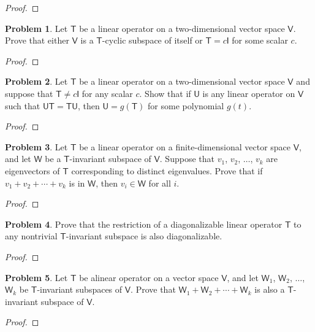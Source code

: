 \documentclass[12pt]{book}
\theoremstyle{definition}
\newtheorem{problem}{Problem}
\begin{document}
	\begin{proof}
	\end{proof}
	\newpage
	\begin{problem}
		Let $\mathsf{T}$ be a linear operator on a two-dimensional vector space $\mathsf{V}$. Prove that either $\mathsf{V}$ is a $\mathsf{T}$-cyclic subspace of itself or $\mathsf{T}=c\mathsf{I}$ for some scalar $c$.
	\end{problem}
	\begin{proof}
	\end{proof}
	\newpage
	\begin{problem}
		Let $\mathsf{T}$ be a linear operator on a two-dimensional vector space $\mathsf{V}$ and suppose that $\mathsf{T}\neq c\mathsf{I}$ for any scalar $c$. Show that if $\mathsf{U}$ is any linear operator on $\mathsf{V}$ such that $\mathsf{UT}=\mathsf{TU}$, then $\mathsf{U}=g(\mathsf{T})$ for some polynomial $g(t)$.
	\end{problem}
	\begin{proof}
	\end{proof}
	\newpage
	\begin{problem}
		Let $\mathsf{T}$ be a linear operator on a finite-dimensional vector space $\mathsf{V}$, and let $\mathsf{W}$ be a $\mathsf{T}$-invariant subspace of $\mathsf{V}$. Suppose that $v_1$, $v_2$, $\ldots$, $v_k$ are eigenvectors of $\mathsf{T}$ corresponding to distinct eigenvalues. Prove that if $v_1+v_2+\cdots+v_k$ is in $\mathsf{W}$, then $v_i\in\mathsf{W}$ for all $i$.
	\end{problem}
	\begin{proof}
	\end{proof}
	\newpage
	\begin{problem}
		Prove that the restriction of a diagonalizable linear operator $\mathsf{T}$ to any nontrivial $\mathsf{T}$-invariant subspace is also diagonalizable.
	\end{problem}
	\begin{proof}
	\end{proof}
	\newpage
	\setcounter{problem}{32}
	\begin{problem}
		Let $\mathsf{T}$ be alinear operator on a vector space $\mathsf{V}$, and let $\mathsf{W}_1$, $\mathsf{W}_2$, $\ldots$, $\mathsf{W}_k$ be $\mathsf{T}$-invariant subspaces of $\mathsf{V}$. Prove that $\mathsf{W}_1+\mathsf{W}_2+\cdots+\mathsf{W}_k$ is also a $\mathsf{T}$-invariant subspace of $\mathsf{V}$.
	\end{problem}
	\begin{proof}
	\end{proof}
\end{document}
